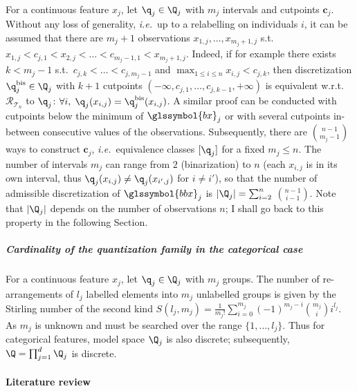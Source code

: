 For a continuous feature $x_j$, let $\q_j \in \Q_j$ with $m_j$ intervals and cutpoints $\boldsymbol{c}_j$. Without any loss of generality, \textit{i.e.}\ up to a relabelling on individuals $i$, it can be assumed that there are $m_j+1$ observations $x_{1,j},\dots,x_{m_j+1,j}$ s.t.\ $x_{1,j} < c_{j,1} < x_{2,j} < \dots < c_{m_j-1,1} < x_{m_j+1,j}$. Indeed, if for example there exists $k < m_j - 1$ s.t.\ $c_{j,k} < \dots < c_{j,m_j-1}$ and $\max_{1 \leq i \leq n} x_{i,j} < c_{j,k}$, then discretization $\q^{\text{bis}}_j \in \Q_j$ with $k+1$ cutpoints $(-\infty,c_{j,1},\dots,c_{j,k-1},+\infty)$ is equivalent w.r.t.\ $\mathcal{R}_{\mathcal{T}_n}$ to $\q_j$: $\forall i, \; \q_j(x_{i,j}) = \q^{\text{bis}}_j(x_{i,j})$. A similar proof can be conducted with cutpoints below the minimum of $\glssymbol{bx}_j$ or with several cutpoints in-between consecutive values of the observations. Subsequently, there are $\binom{n-1}{m_j-1}$ ways to construct $\bm{c}_j$, \textit{i.e.}\ equivalence classes $[\q_j]$ for a fixed $m_j \leq n$. The number of intervals $m_j$ can range from $2$ (binarization) to $n$ (each $x_{i,j}$ is in its own interval, thus $\q_j(x_{i,j}) \neq \q_j(x_{i',j})$ for $i \neq i'$), so that the number of admissible discretization of $\glssymbol{bbx}_j$ is $|\Q_j| = \sum_{i=2}^{n}$ ${n-1}\choose{i-1}$. Note that $|\Q_j|$ depends on the number of observations $n$; I shall go back to this property in the following Section.


\subparagraph{Cardinality of the quantization family in the categorical case}

For a continuous feature $x_j$, let $\q_j \in \Q_j$ with $m_j$ groups. The number of re-arrangements of $l_j$ labelled elements into $m_j$ unlabelled groups is given by the Stirling number of the second kind $S(l_j,m_j) = \frac{1}{m_j!} \sum_{i=0}^{m_j} (-1)^{m_j-i} {m_j \choose i} i^{l_j}$. As $m_j$ is unknown and must be searched over the range $\{1,\dots,l_j\}$. Thus for categorical features, model space $\Q_j$ is also discrete; subsequently, $\Q = \prod_{j=1}^d \Q_j$ is discrete.







\paragraph{Literature review}

